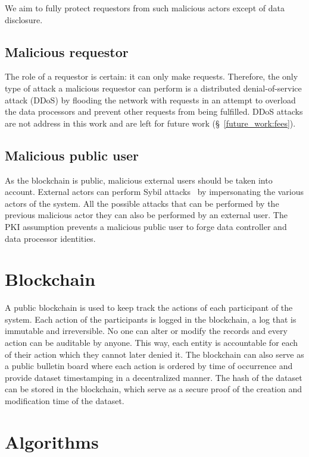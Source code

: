 We aim to fully protect requestors from such malicious actors except of data disclosure.

\subsection{Malicious requestor}
\label{solution:treat_model:mrequestor}

The role of a requestor is certain: it can only make requests. Therefore, the only type of attack a malicious requestor can perform is a distributed denial-of-service attack (DDoS) by flooding the network with requests in an attempt to overload the data processors and prevent other requests from being fulfilled. DDoS attacks are not address in this work and are left for future work (§~\ref{future_work:fees}).

\subsection{Malicious public user}
\label{solution:treat_model:mpublic_user}

As the blockchain is public, malicious external users should be taken into account. External actors can perform Sybil attacks~\cite{sybil_attack} by impersonating the various actors of the system. All the possible attacks that can be performed by the previous malicious actor they can also be performed by an external user. The PKI assumption prevents a malicious public user to forge data controller and data processor identities.

\section{Blockchain}
\label{solution:blockchain}

Α public blockchain is used to keep track the actions of each participant of the system. Each action of the participants is logged in the blockchain, a log that is immutable and irreversible. No one can alter or modify the records and every action can be auditable by anyone. This way, each entity is accountable for each of their action which they cannot later denied it. The blockchain can also serve as a public bulletin board where each action is ordered by time of occurrence and provide dataset timestamping in a decentralized manner. The hash of the dataset can be stored in the blockchain, which serve as a secure proof of the creation and modification time of the dataset.

\section{Algorithms}
\label{solution:algorithms}

